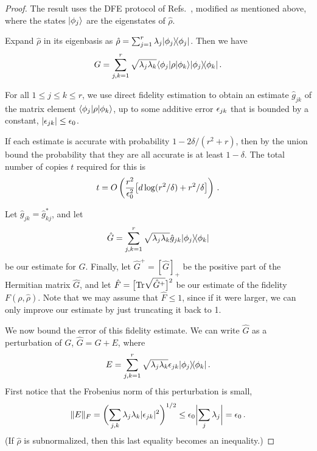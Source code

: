 \begin{proof}
The result uses the DFE protocol of Refs.~\cite{Flammia2011, daSilva2011}, modified as mentioned above, where the states $|{\phi_j}\rangle$ are the eigenstates of $\hat\rho$.

Expand $\hat\rho$ in its eigenbasis as $\hat\rho = \sum_{j=1}^r \lambda_j |{\phi_j}\rangle\!\langle{\phi_j}|$.  Then we have 
\begin{align}
	G = \sum_{j,k=1}^r \sqrt{\lambda_j \lambda_k} \langle{\phi_j}| \rho |{\phi_k}\rangle|{\phi_j}\rangle\!\langle{\phi_k}| \,.
\end{align}

For all $1\leq j\leq k\leq r$, we use direct fidelity estimation to obtain an estimate $\hat{g}_{jk}$ of the matrix element $\langle{\phi_j}|\rho|{\phi_k}\rangle$, up to some additive error $\epsilon_{jk}$ that is bounded by a constant, $\lvert\epsilon_{jk}\rvert\le\epsilon_0$. 

If each estimate is accurate with probability $1-2 \delta/(r^2+r)$, then by the union bound the probability that they are all accurate is at least $1-\delta$. The total number of copies $t$ required for this is 
\begin{align}
	t=O\left(\frac{r^2}{\epsilon_0^2}\bigr[d \log(r^2/\delta) + r^2/\delta\bigl]\right) \,.
\end{align}

Let $\hat{g}_{jk} = \hat{g}_{kj}^*$, and let 
\begin{align}
	\hat{G} = \sum_{j,k=1}^r \sqrt{\lambda_j \lambda_k} \hat{g}_{jk} |{\phi_j}\rangle\!\langle{\phi_k}|
\end{align}
be our estimate for $G$.  Finally, let $\hat{G}^+ = [\hat{G}]_+$ be the positive part of the Hermitian matrix $\hat{G}$, and let $\hat{F} = \bigl[\mathrm{Tr}\sqrt{\hat{G}^+}\bigr]^2$ be our estimate of the fidelity $F(\rho,\hat\rho)$. Note that we may assume that $\hat F \le 1$, since if it were larger, we can only improve our estimate by just truncating it back to 1. 

We now bound the error of this fidelity estimate.  We can write $\hat{G}$ as a perturbation of $G$, $\hat{G} = G+E$, where 
\begin{align}
	E = \sum_{j,k=1}^r \sqrt{\lambda_j \lambda_k} \epsilon_{jk} |{\phi_j}\rangle\!\langle{\phi_k}| \,.
\end{align}
First notice that the Frobenius norm of this perturbation is small,
\begin{align}
	\lVert E\rVert_F = \biggl(\sum_{j,k} \lambda_j \lambda_k \lvert\epsilon_{jk}\rvert^2 \biggr)^{1/2} \le \epsilon_0 \biggl\vert\sum_j \lambda_j \biggr\rvert = \epsilon_0 \,.
\end{align}
(If $\hat\rho$ is subnormalized, then this last equality becomes an inequality.)


\end{proof}
